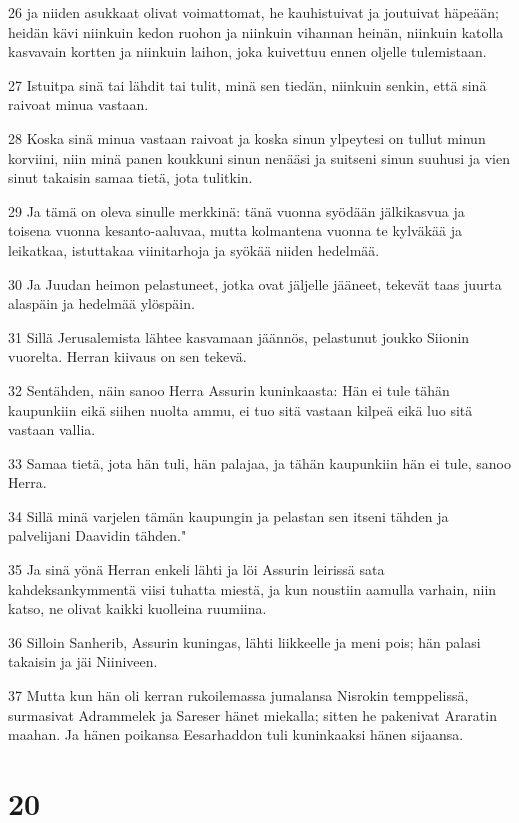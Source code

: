 \par 26 ja niiden asukkaat olivat voimattomat, he kauhistuivat ja joutuivat häpeään; heidän kävi niinkuin kedon ruohon ja niinkuin vihannan heinän, niinkuin katolla kasvavain kortten ja niinkuin laihon, joka kuivettuu ennen oljelle tulemistaan.
\par 27 Istuitpa sinä tai lähdit tai tulit, minä sen tiedän, niinkuin senkin, että sinä raivoat minua vastaan.
\par 28 Koska sinä minua vastaan raivoat ja koska sinun ylpeytesi on tullut minun korviini, niin minä panen koukkuni sinun nenääsi ja suitseni sinun suuhusi ja vien sinut takaisin samaa tietä, jota tulitkin.
\par 29 Ja tämä on oleva sinulle merkkinä: tänä vuonna syödään jälkikasvua ja toisena vuonna kesanto-aaluvaa, mutta kolmantena vuonna te kylväkää ja leikatkaa, istuttakaa viinitarhoja ja syökää niiden hedelmää.
\par 30 Ja Juudan heimon pelastuneet, jotka ovat jäljelle jääneet, tekevät taas juurta alaspäin ja hedelmää ylöspäin.
\par 31 Sillä Jerusalemista lähtee kasvamaan jäännös, pelastunut joukko Siionin vuorelta. Herran kiivaus on sen tekevä.
\par 32 Sentähden, näin sanoo Herra Assurin kuninkaasta: Hän ei tule tähän kaupunkiin eikä siihen nuolta ammu, ei tuo sitä vastaan kilpeä eikä luo sitä vastaan vallia.
\par 33 Samaa tietä, jota hän tuli, hän palajaa, ja tähän kaupunkiin hän ei tule, sanoo Herra.
\par 34 Sillä minä varjelen tämän kaupungin ja pelastan sen itseni tähden ja palvelijani Daavidin tähden."
\par 35 Ja sinä yönä Herran enkeli lähti ja löi Assurin leirissä sata kahdeksankymmentä viisi tuhatta miestä, ja kun noustiin aamulla varhain, niin katso, ne olivat kaikki kuolleina ruumiina.
\par 36 Silloin Sanherib, Assurin kuningas, lähti liikkeelle ja meni pois; hän palasi takaisin ja jäi Niiniveen.
\par 37 Mutta kun hän oli kerran rukoilemassa jumalansa Nisrokin temppelissä, surmasivat Adrammelek ja Sareser hänet miekalla; sitten he pakenivat Araratin maahan. Ja hänen poikansa Eesarhaddon tuli kuninkaaksi hänen sijaansa.

\chapter{20}

